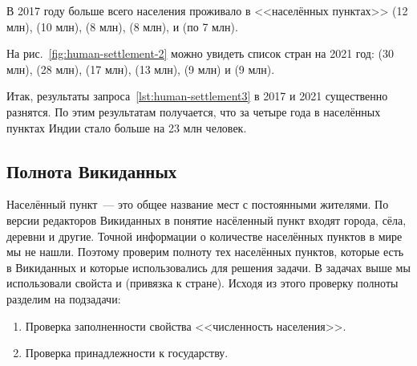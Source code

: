 
В 2017 году больше всего населения проживало в <<населённых пунктах>> 
 (\num{12} млн), 
 (\num{10} млн), 
 (\num{8} млн), 
 (\num{8} млн), 
 и 
 (по \num{7} млн). 

На рис.~\ref{fig:human-settlement-2} можно увидеть список стран на 2021 год: 
 (\num{30} млн), 
 (\num{28} млн), 
 (\num{17} млн), 
 (\num{13} млн), 
 (\num{9} млн) и 
 (\num{9} млн). 

Итак, результаты запроса~\ref{lst:human-settlement3} в 2017 и 2021 существенно разнятся. 
По этим результатам получается, что за четыре года 
в населённых пунктах Индии стало больше на 23 млн человек. 


\subsection{Полнота Викиданных}

Населённый пункт~--- это общее название мест с постоянными жителями\autocite{Humansettlements_Dictionary}. 
По версии редакторов Викиданных в понятие насёленный пункт входят города, сёла, деревни 
и другие.
Точной информации о количестве населённых пунктов в мире мы не нашли. 
Поэтому проверим полноту тех населённых пунктов, которые есть в Викиданных 
и которые использовались для решения задачи. 
В задачах выше мы использовали свойста  и 
 (привязка к стране). 
Исходя из этого проверку полноты разделим на подзадачи: 
\begin{enumerate} 
  \item Проверка заполненности свойства <<численность населения>>.
  \item Проверка принадлежности к государству.
\end{enumerate}


